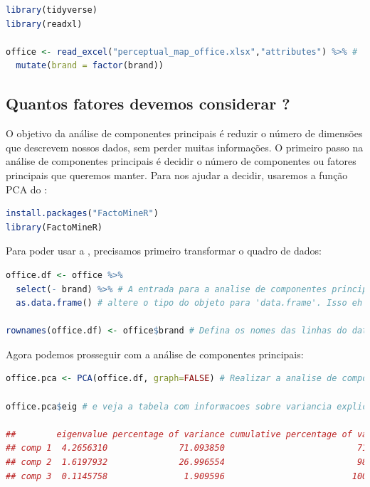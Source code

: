 \documentclass{article}
\begin{document}
\begin{lstlisting}[language=R]
library(tidyverse)
library(readxl)

office <- read_excel("perceptual_map_office.xlsx","attributes") %>% # 
  mutate(brand = factor(brand))
\end{lstlisting}



\subsection{Quantos fatores devemos considerar ?}

O objetivo da análise de componentes principais é reduzir o número de dimensões que descrevem nossos dados, sem perder muitas informações. O primeiro passo na análise de componentes principais é decidir o número de componentes ou fatores principais que queremos manter. Para nos ajudar a decidir, usaremos a função PCA do :

\begin{lstlisting}[language=R]
install.packages("FactoMineR")
library(FactoMineR)
\end{lstlisting}

\newpage

Para poder usar a , precisamos primeiro transformar o quadro de dados:

\begin{lstlisting}[language=R]
office.df <- office %>% 
  select(- brand) %>% # A entrada para a analise de componentes principais deve ser apenas as dimensoes, nao o (s) identificador (es); portanto, vamos remover os identificadores.
  as.data.frame() # altere o tipo do objeto para 'data.frame'. Isso eh necessario para a funcao PCA

rownames(office.df) <- office$brand # Defina os nomes das linhas do data.frame para as marcas (isso eh importante mais tarde ao fazer um biplot)
\end{lstlisting}

Agora podemos prosseguir com a análise de componentes principais:

\begin{lstlisting}[language=R]
office.pca <- PCA(office.df, graph=FALSE) # Realizar a analise de componentes principais

office.pca$eig # e veja a tabela com informacoes sobre variancia explicada

##        eigenvalue percentage of variance cumulative percentage of variance
## comp 1  4.2656310              71.093850                          71.09385
## comp 2  1.6197932              26.996554                          98.09040
## comp 3  0.1145758               1.909596                         100.00000
\end{lstlisting}
\end{document}
